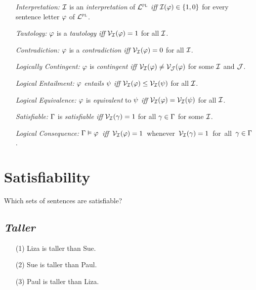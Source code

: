 \documentclass[a4paper, 11pt]{article} %
\begin{document}
\begin{itemize}[leftmargin=1.5in,labelsep=.15in] %
  \item[\it Interpretation:] $\mathcal{I}$ is an \textit{interpretation} of $\mathcal{L}^{\textsc{pl}}$ \textit{iff} $\mathcal{I}(\varphi) \in \lbrace1, 0\rbrace$ for every sentence letter $\varphi$ of $\mathcal{L}^{\textsc{pl}}$. 
  \item[\it Tautology:] $\varphi$ is a \textit{tautology iff} $\mathcal{V}_{\mathcal{I}}(\varphi) = 1$ for all $\mathcal{I}$.
  \item[\it Contradiction:] $\varphi$ is a \textit{contradiction iff} $\mathcal{V}_{\mathcal{I}}(\varphi) = 0$ for all $\mathcal{I}$.
  \item[\it Logically Contingent:] $\varphi$ is \textit{contingent iff} $\mathcal{V}_{\mathcal{I}}(\varphi) \neq \mathcal{V}_{\mathcal{J}}(\varphi)$ for some $\mathcal{I}$ and $\mathcal{J}$.
  \item[\it Logical Entailment:] $\varphi$ \textit{entails} $\psi$ \textit{iff} $\mathcal{V}_{\mathcal{I}}(\varphi) \leq \mathcal{V}_{\mathcal{I}}(\psi)$ for all $\mathcal{I}$.
  \item[\it Logical Equivalence:] $\varphi$ is \textit{equivalent} to $\psi$ \textit{iff} $\mathcal{V}_{\mathcal{I}}(\varphi) = \mathcal{V}_{\mathcal{I}}(\psi)$ for all $\mathcal{I}$.
  \item[\it Satisfiable:] $\Gamma$ is \textit{satisfiable iff} $\mathcal{V}_{\mathcal{I}}(\gamma) = 1$ for all $\gamma \in \Gamma$ for some $\mathcal{I}$.
  \item[\it Logical Consequence:] \mbox{$\Gamma \vDash \varphi$ \textit{iff} $\mathcal{V}_{\mathcal{I}}(\varphi) = 1$ whenever $\mathcal{V}_{\mathcal{I}}(\gamma) = 1$ for all $\gamma \in \Gamma$.}
\end{itemize}



\section*{Satisfiability}

\noindent
Which sets of sentences are satisfiable?

\subsection*{\it \textbf{Taller}}

\begin{enumerate}
  \item[(1)] Liza is taller than Sue.
  \item[(2)] Sue is taller than Paul.
  \item[(3)] Paul is taller than Liza.
\end{enumerate}
\end{document}
